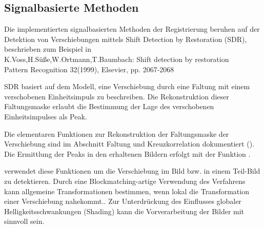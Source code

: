 
\subsection{Signalbasierte Methoden}
Die implementierten signalbasierten Methoden der Registrierung 
beruhen auf der Detektion von Verschiebungen mittels
Shift Detection by Restoration (SDR), beschrieben zum Beispiel in \\

{
\noindent
K.Voss,H.Süße,W.Ortmann,T.Baumbach: Shift detection by restoration\\
Pattern Recognition 32(1999), Elsevier, pp. 2067-2068\\
}

SDR basiert auf dem Modell, eine Verschiebung durch eine 
Faltung mit einem verschobenen Einheitsimpuls zu beschreiben. 
Die Rekonstruktion dieser Faltungsmaske erlaubt die Bestimmung 
der Lage des verschobenen Einheitsimpulses als Peak.

Die elementaren Funktionen zur Rekonstruktion der Faltungsmaske
der Verschiebung sind im Abschnitt Faltung und Kreuzkorrelation 
dokumentiert (). Die Ermittlung der Peaks
in den erhaltenen Bildern erfolgt mit der Funktion .

 verwendet diese Funktionen um die Verschiebung im Bild 
bzw. in einem Teil-Bild zu detektieren. Durch eine Blockmatching-artige
Verwendung des Verfahrens kann  allgemeine 
Transformationen bestimmen, wenn lokal die Transformation 
einer Verschiebung nahekommt.. 
Zur Unterdrückung des Einflusses globaler Helligkeitsschwankungen (Shading) 
kann die Vorverarbeitung der Bilder mit  sinnvoll sein.


